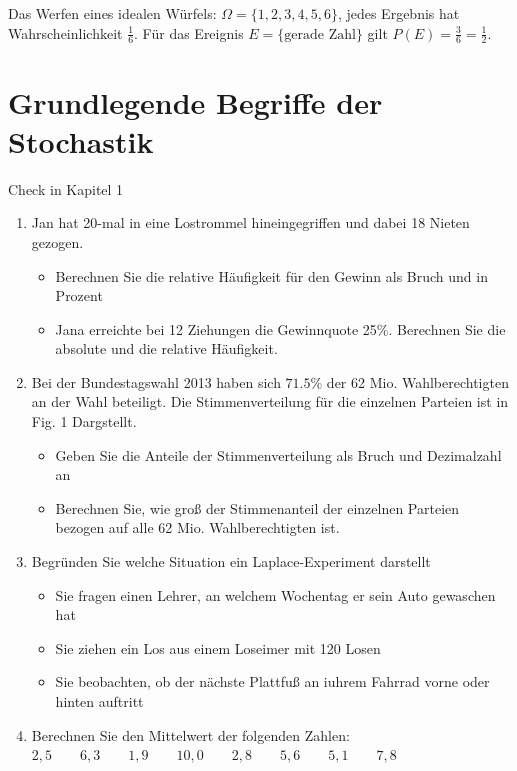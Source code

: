 \documentclass[11pt,a4paper,oneside]{article}
\begin{document}
	\begin{exem}
		Das Werfen eines idealen Würfels: $\Omega = \{1,2,3,4,5,6\}$,
		jedes Ergebnis hat Wahrscheinlichkeit $\tfrac{1}{6}$.
		Für das Ereignis $E=\{\text{gerade Zahl}\}$ gilt
		$P(E)=\tfrac{3}{6}=\tfrac{1}{2}$.
	\end{exem}
	
	\newpage
	
	\section{Grundlegende Begriffe der Stochastik}
	
	\begin{aufgabe}{Check in Kapitel 1}
		\begin{enumerate}
			\item Jan hat 20-mal in eine Lostrommel hineingegriffen und dabei 18 Nieten gezogen. 
			\begin{itemize}
				\item Berechnen Sie die relative Häufigkeit für den Gewinn als Bruch und in Prozent
				\item Jana erreichte bei 12 Ziehungen die Gewinnquote 25\%. Berechnen Sie die absolute und die relative Häufigkeit. 
			\end{itemize}
		\item Bei der Bundestagswahl 2013 haben sich $71.5\%$ der 62 Mio. Wahlberechtigten an der Wahl beteiligt. Die Stimmenverteilung für die einzelnen Parteien ist in Fig. 1 Dargstellt. 
		\begin{itemize}
			\item Geben Sie die Anteile der Stimmenverteilung als Bruch und Dezimalzahl an
			\item Berechnen Sie, wie groß der Stimmenanteil der einzelnen Parteien bezogen auf alle 62 Mio. Wahlberechtigten ist.
		\end{itemize}
		\item Begründen Sie welche Situation ein Laplace-Experiment darstellt
		\begin{itemize}
			\item Sie fragen einen Lehrer, an welchem Wochentag er sein Auto gewaschen hat 
			\item Sie ziehen ein Los aus einem Loseimer mit 120 Losen 
			\item Sie beobachten, ob der nächste Plattfuß an iuhrem Fahrrad vorne oder hinten auftritt
		\end{itemize}
		\item Berechnen Sie den Mittelwert der folgenden Zahlen: \\
		$2,5 \qquad 6,3 \qquad 1,9 \qquad 10, 0 \qquad 2,8 \qquad 5,6 \qquad 5,1 \qquad 7,8$
		\end{enumerate}
	\end{aufgabe}
	
\end{document}
